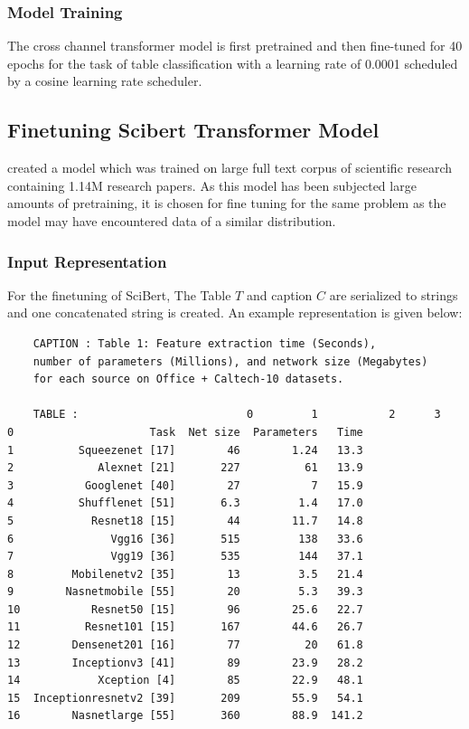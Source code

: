 \subsubsection{Model Training}
The cross channel transformer model is first pretrained and then fine-tuned for 40 epochs for the task of table classification with a learning rate of 0.0001 scheduled by a cosine learning rate scheduler. 

\subsection{Finetuning Scibert Transformer Model}
\cite{beltagy2019scibert} created a model which was trained on large full text corpus of scientific research containing 1.14M research papers. As this model has been subjected large amounts of pretraining, it is chosen for fine tuning for the same problem as the model may have encountered data of a similar distribution. 
\subsubsection{Input Representation}
\label{table_classification:models:sb:input_rep}
For the finetuning of SciBert, The Table $T$ and caption $C$ are serialized to strings and one concatenated string is created. An example representation is given below: 
\begin{verbatim}
    CAPTION : Table 1: Feature extraction time (Seconds), 
    number of parameters (Millions), and network size (Megabytes) 
    for each source on Office + Caltech-10 datasets.

    TABLE :                          0         1           2      3
0                     Task  Net size  Parameters   Time
1          Squeezenet [17]        46        1.24   13.3
2             Alexnet [21]       227          61   13.9
3           Googlenet [40]        27           7   15.9
4          Shufflenet [51]       6.3         1.4   17.0
5            Resnet18 [15]        44        11.7   14.8
6               Vgg16 [36]       515         138   33.6
7               Vgg19 [36]       535         144   37.1
8         Mobilenetv2 [35]        13         3.5   21.4
9        Nasnetmobile [55]        20         5.3   39.3
10           Resnet50 [15]        96        25.6   22.7
11          Resnet101 [15]       167        44.6   26.7
12        Densenet201 [16]        77          20   61.8
13        Inceptionv3 [41]        89        23.9   28.2
14            Xception [4]        85        22.9   48.1
15  Inceptionresnetv2 [39]       209        55.9   54.1
16        Nasnetlarge [55]       360        88.9  141.2
\end{verbatim}

